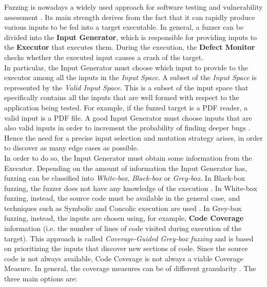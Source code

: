 Fuzzing is nowadays a widely used approach for software testing and vulnerability assessment \cite{Zhu2022,Mallissery2023}.
    Its main strength derives from the fact that it can rapidly produce various inputs to be fed into a target executable.
    In general, a fuzzer can be divided into the \textbf{Input Generator}, which is responsible for providing inputs to the \textbf{Executor} that executes them.
    During the execution, the \textbf{Defect Monitor} checks whether the executed input causes a crash of the target.\\
    In particular, the Input Generator must choose which input to provide to the executor among all the inputs in the \textit{Input Space}.
    A subset of the \textit{Input Space} is represented by the \textit{Valid Input Space}.
    This is a subset of the input space that specifically contains all the inputs that are well formed with respect to the
    application being tested.
    For example, if the fuzzed target is a PDF reader, a valid input is a PDF file.
    A good Input Generator must choose inputs that are also valid inputs in order to increment the probability of finding 
    deeper bugs \cite{Zhu2022}.
    Hence the need for a precise input selection and mutation strategy arises, in order to discover as many edge cases as possible.\\
    In order to do so, the Input Generator must obtain some information from the Executor.
    Depending on the amount of information the Input Generator has, fuzzing can be classified into
    \textit{White-box}, \textit{Black-box} or \textit{Grey-box}.
    In Black-box fuzzing, the fuzzer does not have any knowledge of the execution \cite{Miller1990}.
    In White-box fuzzing, instead, the source code must be available in the general case, and techniques such as Symbolic and Concolic execution are used \cite{Godefroid2012}.
    In Grey-box fuzzing, instead, the inputs are chosen using, for example, \textbf{Code Coverage} information (i.e. the number of lines of code visited during execution of the target).
    This approach is called \textit{Coverage-Guided Grey-box fuzzing} and is based on prioritizing the inputs that discover new sections of code.
    Since the source code is not always available, Code Coverage is not always a viable Coverage Measure.
    In general, the coverage measures can be of different granularity \cite{CollAFL}.
    The three main options are:
